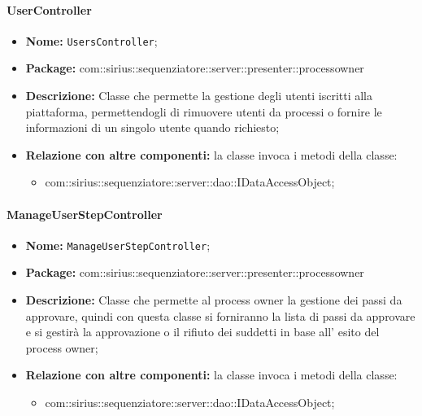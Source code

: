\paragraph{UserController}
	\begin{itemize}
		\item \textbf{Nome:} \texttt{UsersController};
		\item \textbf{Package:} com::sirius::sequenziatore::server::presenter::processowner
		\item \textbf{Descrizione:} Classe che permette la gestione degli utenti iscritti alla piattaforma, permettendogli di rimuovere utenti da processi o fornire le informazioni di un singolo utente quando richiesto;
		\item \textbf{Relazione con altre componenti:} la classe invoca i metodi della classe:
		\begin{itemize}
			\item com::sirius::sequenziatore::server::dao::IDataAccessObject;
		\end{itemize}
	\end{itemize}

\paragraph{ManageUserStepController}
	\begin{itemize}
		\item \textbf{Nome:} \texttt{ManageUserStepController};
		\item \textbf{Package:} com::sirius::sequenziatore::server::presenter::processowner
		\item \textbf{Descrizione:} Classe che permette al process owner la gestione dei passi da approvare, quindi con questa classe si forniranno la lista di passi da approvare e si gestirà la approvazione o il rifiuto dei suddetti in base all' esito del process owner;
		\item \textbf{Relazione con altre componenti:} la classe invoca i metodi della classe:
		\begin{itemize}
			\item com::sirius::sequenziatore::server::dao::IDataAccessObject;
		\end{itemize}
	\end{itemize}
